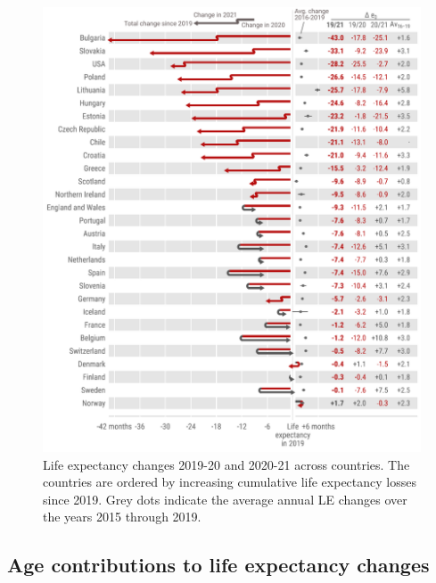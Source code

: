 \documentclass[12pt]{article}
\begin{document}
\begin{figure}[ht!]
    \centering
    \includegraphics{50-e0diffT.pdf}
    \caption{Life expectancy changes 2019-20 and 2020-21 across countries. The countries are ordered by increasing cumulative life expectancy losses since 2019. Grey dots indicate the average annual LE changes over the years 2015 through 2019.}
    \label{fig:de0}
\end{figure}

\subsection*{Age contributions to life expectancy changes}
\end{document}
